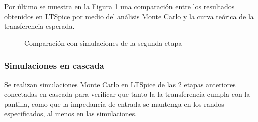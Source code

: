 Por \'ultimo se muestra en la Figura \ref{fig:FIRST_LT_VS_TEO} una comparaci\'on entre los resultados obtenidos en LTSpice por medio del an\'alisis Monte Carlo y la curva te\'orica de la transferencia esperada.
\begin{figure}[H]
    \centering
    \caption{Comparaci\'on con simulaciones de la segunda etapa}
    \label{fig:FIRST_LT_VS_TEO}
\end{figure}

\subsubsection{Simulaciones en cascada}
Se realizan simulaciones Monte Carlo en LTSpice de las 2 etapas anteriores conectadas en cascada para verificar que tanto la la transferencia cumpla con la pantilla, como que la impedancia de entrada se mantenga en los randos especificados, al menos en las simulaciones.

